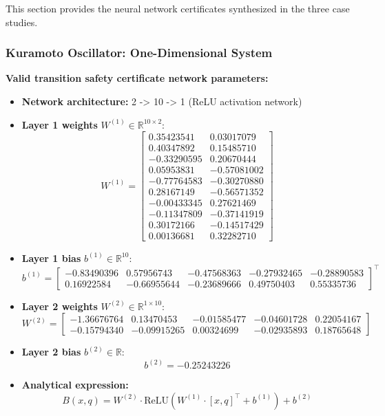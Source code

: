 This section provides the neural network certificates synthesized in the three case studies.

\subsubsection{Kuramoto Oscillator: One-Dimensional System}
\label{app:ko1d_neural}
\textbf{Valid transition safety certificate network parameters:}
\begin{itemize}
    \item \textbf{Network architecture:} 2 -> 10 -> 1 (ReLU activation network)
    \item \textbf{Layer 1 weights} $W^{(1)} \in \mathbb{R}^{10 \times 2}$:
    \[
    W^{(1)} = \begin{bmatrix}
     0.35423541 &  0.03017079 \\
     0.40347892 &  0.15485710 \\
    -0.33290595 &  0.20670444 \\
     0.05953831 & -0.57081002 \\
    -0.77764583 & -0.30270880 \\
     0.28167149 & -0.56571352 \\
    -0.00433345 &  0.27621469 \\
    -0.11347809 & -0.37141919 \\
     0.30172166 & -0.14517429 \\
     0.00136681 &  0.32282710
    \end{bmatrix}
    \]
    
    \item \textbf{Layer 1 bias} $b^{(1)} \in \mathbb{R}^{10}$:
    \[
    b^{(1)} = \begin{bmatrix}
    -0.83490396 &  0.57956743 & -0.47568363 & -0.27932465 & -0.28890583 \\
     0.16922584 & -0.66955644 & -0.23689666 &  0.49750403 &  0.55335736
    \end{bmatrix}^\top
    \]
    
    \item \textbf{Layer 2 weights} $W^{(2)} \in \mathbb{R}^{1 \times 10}$:
    \[
    W^{(2)} = \begin{bmatrix}
    -1.36676764 &  0.13470453 & -0.01585477 & -0.04601728 &  0.22054167 \\
    -0.15794340 & -0.09915265 &  0.00324699 & -0.02935893 &  0.18765648
    \end{bmatrix}
    \]
    
    \item \textbf{Layer 2 bias} $b^{(2)} \in \mathbb{R}$:
    \[
    b^{(2)} = -0.25243226
    \]
    
    \item \textbf{Analytical expression:}
    \[
    B(x, q) = W^{(2)} \cdot \text{ReLU}(W^{(1)} \cdot [x, q]^\top + b^{(1)}) + b^{(2)}
    \]
\end{itemize}

